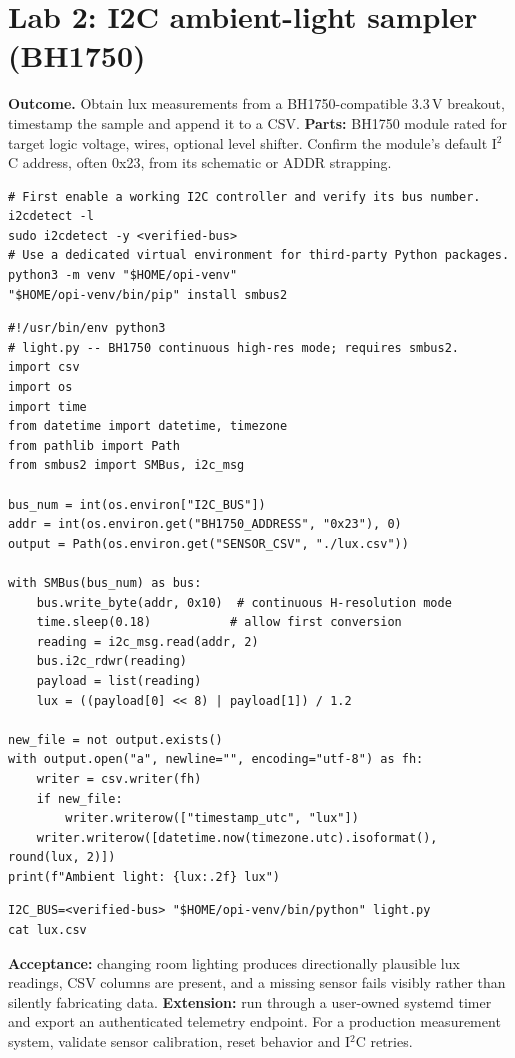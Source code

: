 \documentclass[10pt,oneside,openany]{report}
\newcommand{\tagline}[1]{\noindent{\color{teal}\sffamily\bfseries\small\MakeUppercase{#1}}\par\medskip}
\begin{document}
\section{Lab 2: I2C ambient-light sampler (BH1750)}
\tagline{Difficulty: intermediate \textbullet\ 90--120 minutes}
\textbf{Outcome.} Obtain lux measurements from a BH1750-compatible 3.3\,V breakout, timestamp the sample and append it to a CSV. \textbf{Parts:} BH1750 module rated for target logic voltage, wires, optional level shifter. Confirm the module's default I\(^{2}\)C address, often 0x23, from its schematic or ADDR strapping.
\begin{lstlisting}[style=sh]
# First enable a working I2C controller and verify its bus number.
i2cdetect -l
sudo i2cdetect -y <verified-bus>
# Use a dedicated virtual environment for third-party Python packages.
python3 -m venv "$HOME/opi-venv"
"$HOME/opi-venv/bin/pip" install smbus2
\end{lstlisting}
\begin{lstlisting}[style=python]
#!/usr/bin/env python3
# light.py -- BH1750 continuous high-res mode; requires smbus2.
import csv
import os
import time
from datetime import datetime, timezone
from pathlib import Path
from smbus2 import SMBus, i2c_msg

bus_num = int(os.environ["I2C_BUS"])
addr = int(os.environ.get("BH1750_ADDRESS", "0x23"), 0)
output = Path(os.environ.get("SENSOR_CSV", "./lux.csv"))

with SMBus(bus_num) as bus:
    bus.write_byte(addr, 0x10)  # continuous H-resolution mode
    time.sleep(0.18)           # allow first conversion
    reading = i2c_msg.read(addr, 2)
    bus.i2c_rdwr(reading)
    payload = list(reading)
    lux = ((payload[0] << 8) | payload[1]) / 1.2

new_file = not output.exists()
with output.open("a", newline="", encoding="utf-8") as fh:
    writer = csv.writer(fh)
    if new_file:
        writer.writerow(["timestamp_utc", "lux"])
    writer.writerow([datetime.now(timezone.utc).isoformat(), round(lux, 2)])
print(f"Ambient light: {lux:.2f} lux")
\end{lstlisting}
\begin{lstlisting}[style=sh]
I2C_BUS=<verified-bus> "$HOME/opi-venv/bin/python" light.py
cat lux.csv
\end{lstlisting}
\textbf{Acceptance:} changing room lighting produces directionally plausible lux readings, CSV columns are present, and a missing sensor fails visibly rather than silently fabricating data. \textbf{Extension:} run through a user-owned systemd timer and export an authenticated telemetry endpoint. For a production measurement system, validate sensor calibration, reset behavior and I\(^{2}\)C retries.
\end{document}
